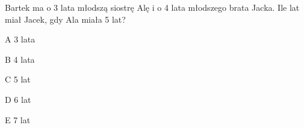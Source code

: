 \begin{tresc}
Bartek ma o 3 lata młodszą siostrę Alę i o 4 lata młodszego brata Jacka. Ile lat miał Jacek, gdy Ala miała 5 lat?
\end{tresc}
\begin{wariant}{A} 3 lata \end{wariant}
\begin{wariant}{B} 4 lata \end{wariant}
\begin{wariant}{C} 5 lat \end{wariant}
\begin{wariant}{D} 6 lat \end{wariant}
\begin{wariant}{E} 7 lat \end{wariant}
